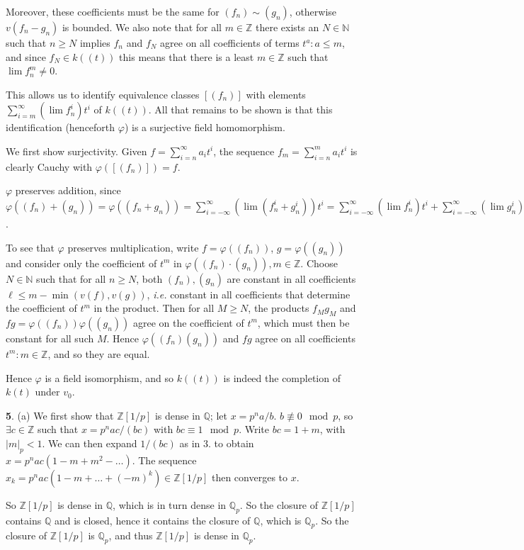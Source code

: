 \documentclass[]{article}
\theoremstyle{custhm}
\theoremstyle{cusdef}
\theoremstyle{custhm}
\theoremstyle{custhm}
\theoremstyle{custhm}
\theoremstyle{custhm}
\theoremstyle{cusdef}
\theoremstyle{remark}
\newcommand{\N}{\mathbb{N}}
\newcommand{\Z}{\mathbb{Z}}
\newcommand{\Q}{\mathbb{Q}}
\renewcommand{\it}[1]{\textit{#1}}
\renewcommand{\phi}{\varphi}
\begin{document}
Moreover, these coefficients must be the same for $(f_n)\sim (g_n)$, otherwise $v(f_n-g_n)$ is bounded. We also note that for all $m\in\Z$ there exists an $N\in\N$ such that $n\ge N$ implies $f_n$ and $f_N$ agree on all coefficients of terms $t^a:a\le m$, and since $f_N\in k((t))$ this means that there is a least $m\in\Z$ such that $\lim f_n^m \ne 0$.

This allows us to identify equivalence classes $[(f_n)]$ with elements $\sum_{i=m}^{\infty}(\lim f_n^i)t^i$ of $k((t))$. All that remains to be shown is that this identification (henceforth $\phi$) is a surjective field homomorphism.

We first show surjectivity. Given $f = \sum_{i=n}^{\infty}a_it^i$, the sequence $f_m = \sum_{i=n}^{m}a_it^i$ is clearly Cauchy with $\phi([(f_n)]) = f$.

$\phi$ preserves addition, since $\phi((f_n)+(g_n)) = \phi((f_n+g_n)) = \sum_{i=-\infty}^{\infty}(\lim(f_n^i+g_n^i))t^i = \sum_{i=-\infty}^{\infty}(\lim f_n^i)t^i +\sum_{i=-\infty}^{\infty}(\lim g_n^i)t^i = \phi((f_n)) + \phi((g_n))$.

To see that $\phi$ preserves multiplication, write $f =\phi((f_n))$, $g = \phi((g_n))$ and  consider only the coefficient of $t^m$ in $\phi((f_n)\cdot(g_n)), m\in\Z$. Choose $N\in\N$ such that for all $n\ge N$, both $(f_n),(g_n)$ are constant in all coefficients $\ell \le m - \min(v(f),v(g))$, \it{i.e.} constant in all coefficients that determine the coefficient of $t^m$ in the product. Then for all $M\ge N$, the products $f_Mg_M$ and $fg=\phi((f_n))\phi((g_n))$ agree on the coefficient of $t^m$, which must then be constant for all such $M$. Hence $\phi((f_n)(g_n))$ and $fg$ agree on all coefficients $t^m:m\in\Z$, and so they are equal.

Hence $\phi$ is a field isomorphism, and so $k((t))$ is indeed the completion of $k(t)$ under $v_0$.

\textbf{5}. (a) We first show that $\Z[1/p]$ is dense in $\Q$; let $x = p^na/b$. $b\not\equiv 0\mod p$, so $\exists c\in\Z$ such that $x = p^nac/(bc)$ with $bc\equiv 1\mod p$. Write $bc = 1 + m$, with $|m|_p < 1$. We can then expand $1/(bc)$ as in 3. to obtain $x = p^nac(1-m+m^2-\dots)$. The sequence $x_k = p^nac(1-m+\dots +(-m)^k)\in\Z[1/p]$ then converges to $x$.

So $\Z[1/p]$ is dense in $\Q$, which is in turn dense in $\Q_p$. So the closure of $\Z[1/p]$ contains $\Q$ and is closed, hence it contains the closure of $\Q$, which is $\Q_p$. So the closure of $\Z[1/p]$ is $\Q_p$, and thus $\Z[1/p]$ is dense in $\Q_p$.
\end{document}

